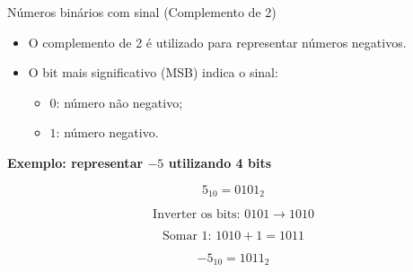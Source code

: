 

\begin{frame}{Números binários com sinal (Complemento de 2)}

    \begin{itemize}
        \item O complemento de 2 é utilizado para representar números negativos.
        \item O bit mais significativo (MSB) indica o sinal:
        \begin{itemize}
            \item $0$: número não negativo;
            \item $1$: número negativo.
        \end{itemize}
    \end{itemize}

    \textbf{Exemplo: representar $-5$ utilizando 4 bits}

    \[
        5_{10} = 0101_{2}
    \]

    \[
        \text{Inverter os bits: }
        0101 \rightarrow 1010
    \]

    \[
        \text{Somar 1: }
        1010 + 1 = 1011
    \]

    \[
        \boxed{-5_{10} = 1011_{2}}
    \]

\end{frame}

